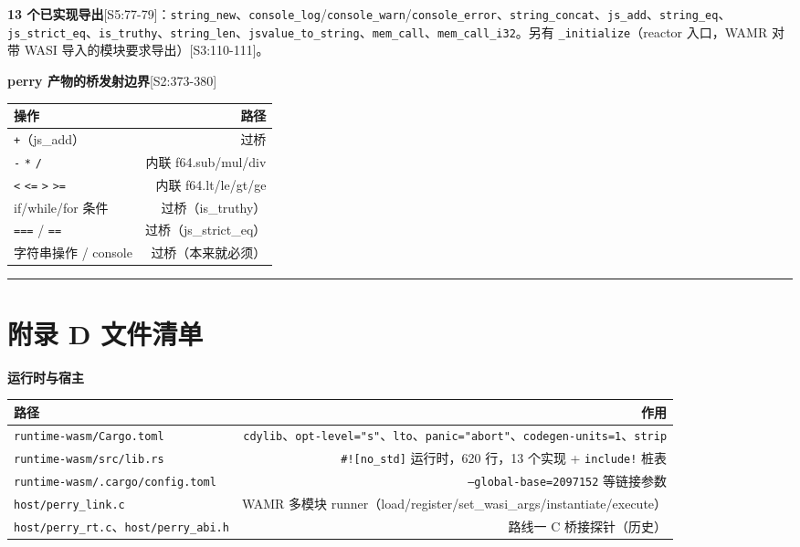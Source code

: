 \documentclass[11pt, a4paper]{article}
\begin{document}
\textbf{13 个已实现导出}[S5:77-79]：\texttt{string\_new}、\texttt{console\_log}/\texttt{console\_warn}/\texttt{console\_error}、\texttt{string\_concat}、\texttt{js\_add}、\texttt{string\_eq}、\texttt{js\_strict\_eq}、\texttt{is\_truthy}、\texttt{string\_len}、\texttt{jsvalue\_to\_string}、\texttt{mem\_call}、\texttt{mem\_call\_i32}。另有 \texttt{\_initialize}（reactor 入口，WAMR 对带 WASI 导入的模块要求导出）[S3:110-111]。


\textbf{perry 产物的桥发射边界}[S2:373-380]


\begin{center}\small\begin{tabular}{lr}
\toprule
操作 & 路径 \\
\midrule
\texttt{+}（js\_add） & 过桥 \\
\texttt{-} \texttt{*} \texttt{/} & 内联 f64.sub/mul/div \\
\texttt{<} \texttt{<=} \texttt{>} \texttt{>=} & 内联 f64.lt/le/gt/ge \\
if/while/for 条件 & 过桥（is\_truthy） \\
\texttt{===} / \texttt{==} & 过桥（js\_strict\_eq） \\
字符串操作 / console & 过桥（本来就必须） \\
\bottomrule
\end{tabular}\end{center}


\bigskip\hrule\bigskip

\section{附录 D 文件清单}

\textbf{运行时与宿主}


\begin{center}\small\begin{tabular}{lr}
\toprule
路径 & 作用 \\
\midrule
\texttt{runtime-wasm/Cargo.toml} & \texttt{cdylib}、\texttt{opt-level="s"}、\texttt{lto}、\texttt{panic="abort"}、\texttt{codegen-units=1}、\texttt{strip} \\
\texttt{runtime-wasm/src/lib.rs} & \texttt{\#![no\_std]} 运行时，620 行，13 个实现 + \texttt{include!} 桩表 \\
\texttt{runtime-wasm/.cargo/config.toml} & \texttt{--global-base=2097152} 等链接参数 \\
\texttt{host/perry\_link.c} & WAMR 多模块 runner（load/register/set\_wasi\_args/instantiate/execute） \\
\texttt{host/perry\_rt.c}、\texttt{host/perry\_abi.h} & 路线一 C 桥接探针（历史） \\
\bottomrule
\end{tabular}\end{center}
\end{document}
